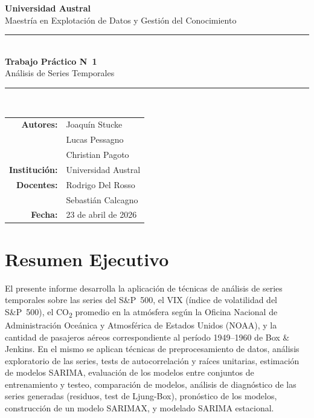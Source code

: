 \documentclass[12pt, a4paper]{article}
\begin{document}
\begin{titlepage}
    \centering
    \vspace*{2cm}

    {\Large \textbf{Universidad Austral}}\\[0.4cm]
    {\large Maestría en Explotación de Datos y Gestión del Conocimiento}\\[2cm]

    \rule{\linewidth}{0.5pt}\\[0.4cm]
    {\LARGE \textbf{Trabajo Práctico N\textdegree~1}}\\[0.3cm]
    {\Large Análisis de Series Temporales}\\[0.3cm]
    \rule{\linewidth}{0.5pt}\\[2cm]

    \begin{tabular}{rl}
        \textbf{Autores:}   & Joaquín Stucke \\
                            & Lucas Pessagno \\
                            & Christian Pagoto \\[0.6cm]
        \textbf{Institución:} & Universidad Austral \\[0.6cm]
        \textbf{Docentes:}  & Rodrigo Del Rosso \\
                            & Sebastián Calcagno \\[0.6cm]
        \textbf{Fecha:}     & 23 de abril de 2026 \\
    \end{tabular}

    \vfill
\end{titlepage}

\newpage
\section*{Resumen Ejecutivo}

El presente informe desarrolla la aplicación de técnicas de análisis de series temporales
sobre las series del S\&P~500, el VIX (índice de volatilidad del S\&P~500), el CO\textsubscript{2}
promedio en la atmósfera según la Oficina Nacional de Administración Oceánica y Atmosférica
de Estados Unidos (NOAA), y la cantidad de pasajeros aéreos correspondiente al período
1949--1960 de Box \& Jenkins. En el mismo se aplican técnicas de preprocesamiento de datos,
análisis exploratorio de las series, tests de autocorrelación y raíces unitarias, estimación
de modelos SARIMA, evaluación de los modelos entre conjuntos de entrenamiento y testeo,
comparación de modelos, análisis de diagnóstico de las series generadas (residuos,
test de Ljung-Box), pronóstico de los modelos, construcción de un modelo SARIMAX, y
modelado SARIMA estacional.
\end{document}
